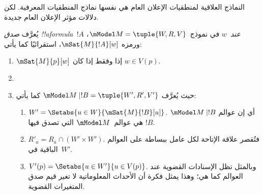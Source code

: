 \documentclass[../../../include/open-logic-section]{subfiles}
\begin{document}


النماذج العلاقية لمنطقيات الإعلان العام هي نفسها نماذج المنطقيات
المعرفية. لكن دلالات مؤثر الإعلان العام جديدة.

\begin{defn} يُعرَّف \emph{صدق !!a{formula}~$!A$
  عند~$w$} في نموذج~$\mModel M = \tuple{W, R, V}$، ورمزه
  $\mSat{M}{!A}[w]$، استقرائيًا كما يأتي:
  \begin{enumerate}
  \item $\mSat{M}{p}[w]$ إذا وفقط إذا كان $w \in V(p)$.
  \item{}
  \item{}

  
  حيث يُعرَّف $\mModel M \mid !B = \tuple{W', R', V'}$ كما يأتي:
  \begin{enumerate}
    \item $W' = \Setabs{ u \in W}{\mSat{M}{!B}[u]}$. أي إن عوالم
      $\mModel M \mid !B$ هي عوالم~$\mModel M$ التي تصدق فيها $!B$.
    \item $R'_a = R_a \cap (W' \times W')$. فتُقصر علاقة الإتاحة لكل
      عامل ببساطة على العوالم الباقية في~$W'$.
    \item $V'(p) = \Setabs{ u \in W'}{u \in V(p) }$. وبالمثل تظل
      الإسنادات القضوية عند العوالم كما هي؛ وهذا يمثل فكرة أن الأحداث
      المعلوماتية لا تغير قيم صدق المتغيرات القضوية.
  \end{enumerate}
  
  \end{enumerate} 
\end{defn}
\end{document}
